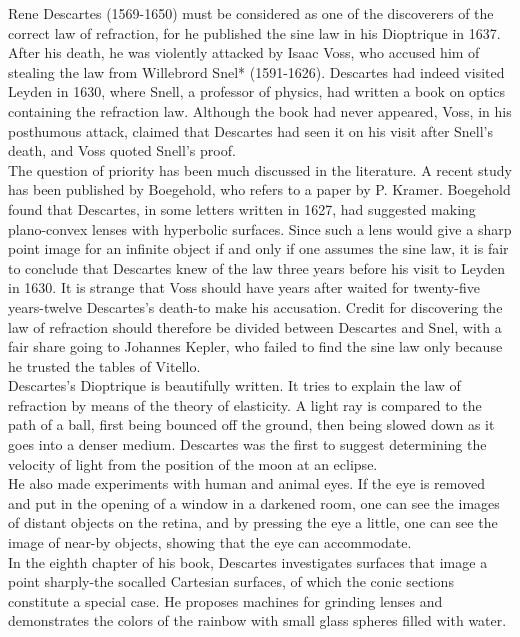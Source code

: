            Rene Descartes (1569-1650)  must be considered as one of the discoverers of the correct law of refraction, for he published the sine law in his Dioptrique in 1637. After his death, he was violently attacked by Isaac Voss, who accused him of stealing the law from Willebrord Snel* (1591-1626). Descartes had indeed visited Leyden in 1630, where Snell, a professor of physics, had written a book on optics containing the refraction law. Although the book had never appeared, Voss, in his posthumous attack, claimed that Descartes had seen it on his visit after Snell's death, and Voss quoted Snell's proof.\\

            The question of priority has been much discussed in the literature. A recent study has been published by Boegehold, who refers to a paper by P. Kramer. Boegehold found that Descartes, in some letters written in 1627, had suggested making plano-convex lenses with hyperbolic surfaces. Since such a lens would give a sharp point image for an infinite object if and only if one assumes the sine law, it is fair to conclude that Descartes knew of the law three years before his visit to Leyden in 1630. It is strange that Voss should have years after waited for twenty-five years-twelve Descartes's death-to make his accusation. Credit for discovering the law of refraction should therefore be divided between Descartes and Snel, with a fair share going to Johannes Kepler, who failed to find the sine law only because he trusted the tables of Vitello.\\
             
            Descartes's Dioptrique is beautifully written. It tries to explain the law of refraction by means of the theory of elasticity. A light ray is compared to the path of a ball, first being bounced off the ground, then being slowed down as it goes into a denser medium. Descartes was the first to suggest determining the velocity of light from the position of the moon at an eclipse.\\

            He also made experiments with human and animal eyes. If the eye is removed and put in the opening of a window in a darkened room, one can see the images of distant objects on the retina, and by pressing the eye a little, one can see the image of near-by objects, showing that the eye can accommodate.\\

            In the eighth chapter of his book, Descartes investigates surfaces that image a point sharply-the socalled Cartesian surfaces, of which the conic sections constitute a special case. He proposes machines for grinding lenses and demonstrates the colors of the rainbow with small glass spheres filled with water.\\

